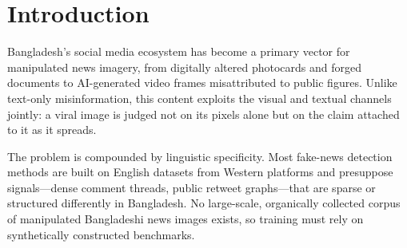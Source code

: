 \documentclass[pdflatex,sn-mathphys-num]{sn-jnl}
\begin{document}
\maketitle



%
%

\section{Introduction}

Bangladesh's social media ecosystem has become a primary vector for manipulated
news imagery, from digitally altered photocards and forged documents to
AI-generated video frames misattributed to public figures. Unlike text-only
misinformation, this content exploits the visual and textual channels jointly:
a viral image is judged not on its pixels alone but on the claim attached to it
as it spreads.

The problem is compounded by linguistic specificity. Most fake-news detection
methods are built on English datasets from Western platforms and presuppose
signals---dense comment threads, public retweet graphs---that are sparse or
structured differently in Bangladesh. No large-scale, organically collected
corpus of manipulated Bangladeshi news images exists, so training must rely on
synthetically constructed benchmarks.
\end{document}
